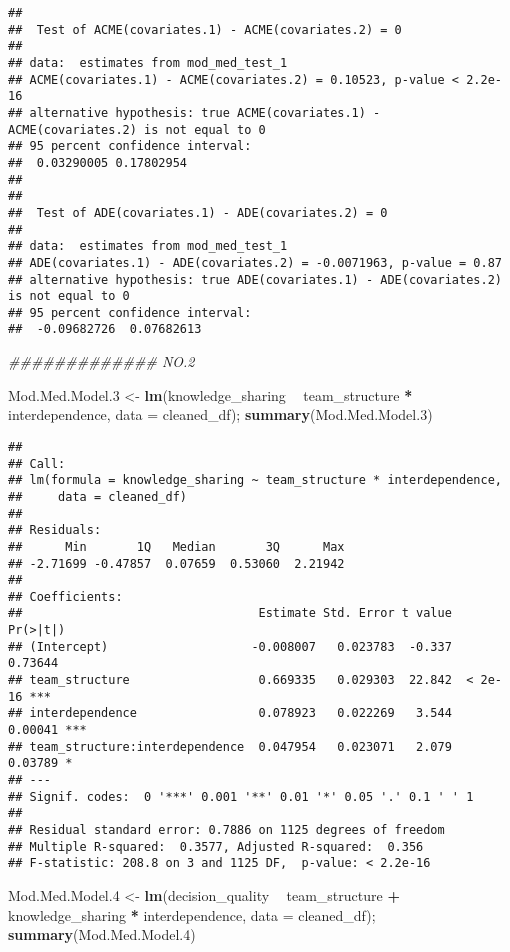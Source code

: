 \documentclass[]{article}
\newenvironment{Shaded}{\begin{snugshade}}{\end{snugshade}}
\newcommand{\CommentTok}[1]{\textcolor[rgb]{0.56,0.35,0.01}{\textit{#1}}}
\newcommand{\DataTypeTok}[1]{\textcolor[rgb]{0.13,0.29,0.53}{#1}}
\newcommand{\FloatTok}[1]{\textcolor[rgb]{0.00,0.00,0.81}{#1}}
\newcommand{\KeywordTok}[1]{\textcolor[rgb]{0.13,0.29,0.53}{\textbf{#1}}}
\newcommand{\NormalTok}[1]{#1}
\newcommand{\OperatorTok}[1]{\textcolor[rgb]{0.81,0.36,0.00}{\textbf{#1}}}
\newcommand{\StringTok}[1]{\textcolor[rgb]{0.31,0.60,0.02}{#1}}
\begin{document}
\begin{verbatim}
## 
##  Test of ACME(covariates.1) - ACME(covariates.2) = 0
## 
## data:  estimates from mod_med_test_1
## ACME(covariates.1) - ACME(covariates.2) = 0.10523, p-value < 2.2e-16
## alternative hypothesis: true ACME(covariates.1) - ACME(covariates.2) is not equal to 0
## 95 percent confidence interval:
##  0.03290005 0.17802954
## 
## 
##  Test of ADE(covariates.1) - ADE(covariates.2) = 0
## 
## data:  estimates from mod_med_test_1
## ADE(covariates.1) - ADE(covariates.2) = -0.0071963, p-value = 0.87
## alternative hypothesis: true ADE(covariates.1) - ADE(covariates.2) is not equal to 0
## 95 percent confidence interval:
##  -0.09682726  0.07682613
\end{verbatim}

\begin{Shaded}
\begin{Highlighting}[]
\CommentTok{############# NO.2}

\NormalTok{Mod.Med.Model}\FloatTok{.3}\NormalTok{ <-}\StringTok{ }\KeywordTok{lm}\NormalTok{(knowledge_sharing }\OperatorTok{~}\StringTok{ }\NormalTok{team_structure }\OperatorTok{*}\StringTok{ }\NormalTok{interdependence, }\DataTypeTok{data =}\NormalTok{ cleaned_df); }\KeywordTok{summary}\NormalTok{(Mod.Med.Model}\FloatTok{.3}\NormalTok{)}
\end{Highlighting}
\end{Shaded}

\begin{verbatim}
## 
## Call:
## lm(formula = knowledge_sharing ~ team_structure * interdependence, 
##     data = cleaned_df)
## 
## Residuals:
##      Min       1Q   Median       3Q      Max 
## -2.71699 -0.47857  0.07659  0.53060  2.21942 
## 
## Coefficients:
##                                 Estimate Std. Error t value Pr(>|t|)    
## (Intercept)                    -0.008007   0.023783  -0.337  0.73644    
## team_structure                  0.669335   0.029303  22.842  < 2e-16 ***
## interdependence                 0.078923   0.022269   3.544  0.00041 ***
## team_structure:interdependence  0.047954   0.023071   2.079  0.03789 *  
## ---
## Signif. codes:  0 '***' 0.001 '**' 0.01 '*' 0.05 '.' 0.1 ' ' 1
## 
## Residual standard error: 0.7886 on 1125 degrees of freedom
## Multiple R-squared:  0.3577, Adjusted R-squared:  0.356 
## F-statistic: 208.8 on 3 and 1125 DF,  p-value: < 2.2e-16
\end{verbatim}

\begin{Shaded}
\begin{Highlighting}[]
\NormalTok{Mod.Med.Model}\FloatTok{.4}\NormalTok{ <-}\StringTok{ }\KeywordTok{lm}\NormalTok{(decision_quality }\OperatorTok{~}\StringTok{ }\NormalTok{team_structure }\OperatorTok{+}\StringTok{ }\NormalTok{knowledge_sharing }\OperatorTok{*}\StringTok{ }\NormalTok{interdependence, }\DataTypeTok{data =}\NormalTok{ cleaned_df); }\KeywordTok{summary}\NormalTok{(Mod.Med.Model}\FloatTok{.4}\NormalTok{)}
\end{Highlighting}
\end{Shaded}
\end{document}
